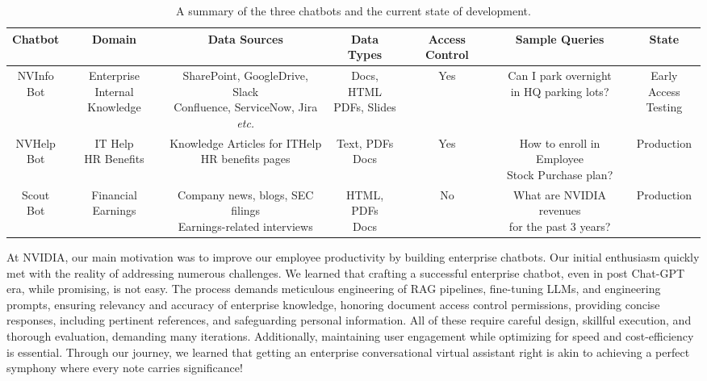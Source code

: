 \documentclass[sigconf]{acmart}
\begin{document}
\begin{table*}[tp!]
\small
\caption{ A summary of the three chatbots and the current state of development. }
\begin{tabular}{c|c|c|c|c|c|c}
\hline 
 Chatbot & Domain & {Data Sources}  & {Data Types}  &   {Access Control}  & {Sample Queries}  & {State}  \\ \hline \hline
 \shortstack{NVInfo \\Bot }&  \shortstack{Enterprise Internal\\   Knowledge}  & \shortstack{SharePoint, GoogleDrive, Slack\\  Confluence, ServiceNow, Jira \emph{etc.}}  & \shortstack{Docs, HTML \\ PDFs, Slides} & Yes & \shortstack{Can I park overnight \\ in HQ parking lots?   } &  \shortstack{Early Access \\ Testing} \\ \hline \hline
 \shortstack{NVHelp \\ Bot} &  \shortstack{IT Help \\ HR Benefits} &  \shortstack{Knowledge Articles for ITHelp \\ HR benefits pages } &  \shortstack{Text, PDFs \\ Docs}  & Yes &  \shortstack{How to enroll in Employee \\ Stock Purchase plan?}  &  Production\\ \hline \hline
 \shortstack{Scout \\ Bot}&  Financial Earnings & \shortstack{Company news, blogs, SEC filings \\ Earnings-related interviews }  & \shortstack{HTML, PDFs \\ Docs}  & No & \shortstack{What are NVIDIA revenues \\ for the past 3 years? } & Production \\ \hline
\end{tabular}
\label{tab:summarize}
\end{table*}


At NVIDIA, our main motivation was to improve our employee productivity by building enterprise chatbots. Our initial enthusiasm quickly met with the reality of addressing numerous challenges. We learned that crafting a successful enterprise chatbot, even in post Chat-GPT era, while promising, is not easy. The process demands meticulous engineering of RAG pipelines, fine-tuning LLMs, and engineering prompts, ensuring relevancy and accuracy of enterprise knowledge, honoring document access control permissions, providing concise responses, including pertinent references, and safeguarding personal information. All of these require careful design, skillful execution, and thorough evaluation, demanding many iterations. Additionally, maintaining user engagement while optimizing for speed and cost-efficiency is essential. Through our journey, we learned that getting an enterprise conversational virtual assistant right is akin to achieving a perfect symphony where every note carries significance!
\end{document}

